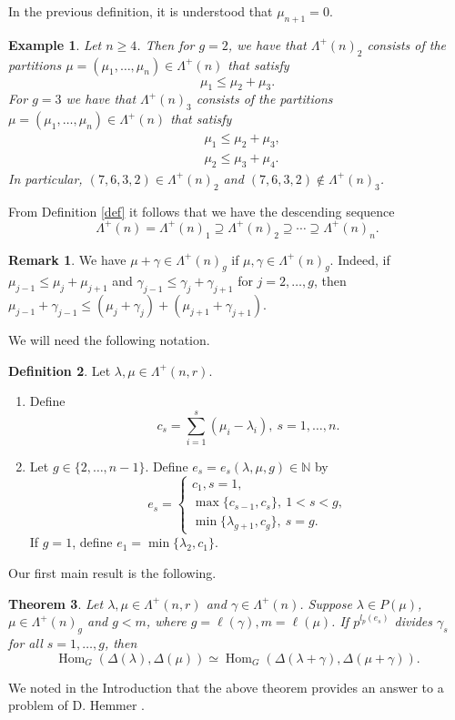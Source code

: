 \documentclass[11pt]{article}
\newtheorem{theo}{Theorem}[section]
\newtheorem*{exam*}{Example}
\theoremstyle{definition}
\newtheorem{defi}[theo]{Definition}
\newtheorem{rema}[theo]{Remark}
\numberwithin{equation}{section}
\newcommand{\m}{\mu}
\newcommand{\la}{\lambda}
\newcommand{\La}{\Lambda}
\DeclareMathOperator{\Hom}{Hom}
\numberwithin{equation}{section}
\begin{document}
	In the previous definition, it is understood that $\mu_{n+1}=0$.
\begin{exam*}Let $n \ge4$. Then for $g=2$, we have that $\La^{+}(n)_2$ consists of the partitions $\mu=(\mu_1, \dots, \mu_n) \in \La^{+}(n)$ that satisfy \[\m_1 \le \mu_2+\mu_3. \]
For $g=3$ we have that $\La^{+}(n)_3$ consists of the partitions $\mu=(\mu_1, \dots, \mu_n) \in \La^{+}(n)$ that satisfy \begin{align*}
	&\mu_1 \le \mu_2+\mu_3,\\
	&\mu_2 \le \mu_3+\mu_4.
\end{align*}
In particular, $(7,6,3,2) \in \La^{+}(n)_2$ and $(7,6,3,2) \notin \La^{+}(n)_3$.
\end{exam*}
From Definition \ref{def} it follows that we have the descending sequence \[\Lambda^+(n) = \Lambda^+(n)_1 \supseteq \Lambda^+(n)_2 \supseteq \cdots \supseteq  \Lambda^+(n)_n . \]
\begin{rema}\label{add}	We have  $\mu + \gamma \in \Lambda^+(n)_g$ if $\mu, \gamma \in \Lambda^+(n)_g.$ Indeed, if $\mu_{j-1} \le \mu_j +\mu_{j+1}$ and $\gamma_{j-1} \le \gamma_j +\gamma_{j+1}$ for $j=2, \dots, g$, then $\mu_{j-1} +\gamma_{j-1} \le (\mu_j +\gamma_j) + (\mu_{j+1} +\gamma_{j+1}).$\end{rema}
	We will need the following notation. \begin{defi}\label{defce} Let $\la, \mu \in \La^{+}(n,r)$.  \begin{enumerate}\item Define \[c_s= \sum_{i=1}^{s}(\mu_i - \lambda_i), \ s=1,\dots,n.\] \item Let $g \in \{2,\dots,n-1\}$. Define $e_s=e_s(\lambda, \mu, g) \in \mathbb{N}$ by
	\begin{equation}\label{e}
		e_s=\begin{cases} c_1, s=1,\\
			\max\{c_{s-1},c_s\}, \ 1<s<g,\\
			\min\{\lambda_{g+1}, c_g\}, \ s=g.
	\end{cases}\end{equation}
If $g=1$, define $e_1 =\min\{\lambda_{2}, c_1\}$. \end{enumerate}\end{defi}
	Our first main result is the following.
	\begin{theo}\label{thm13}Let $\la, \mu \in \La^{+}(n,r)$ and  $\gamma \in \La^{+}(n)$. Suppose $\la \in P(\mu)$, $\mu \in \La^{+}(n)_g$ and $g<m$, where $g=\ell(\gamma), m=\ell(\mu)$. If $p^{l_p(e_s)}$ divides $\gamma_s$ for all $s=1,\dots,g$, then
	\[\Hom_G(\Delta(\la),\Delta(\mu)) \simeq \Hom_{G}(\Delta(\la+\gamma), \Delta(\mu+\gamma)).\]
			\end{theo}  
	We noted in the Introduction that the above theorem provides an answer to a problem  of D. Hemmer \cite[Problem 5.4]{Hem2}. 
	
\end{document}
